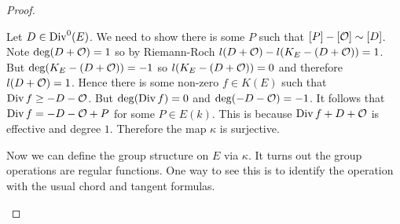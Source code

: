 \documentclass[11pt]{article}
\begin{document}
\begin{proof}
\begin{enumerate}
		Let $D\in \operatorname{Div}^0(E)$. We need to show there is some $P$ such that $[P] - [\mathcal{O}] \sim [D]$. Note $\deg(D+\mathcal{O}) = 1$ so by Riemann-Roch $l(D+\mathcal{O}) - l(K_E - (D + \mathcal{O})) = 1$. But $\deg (K_E - (D+\mathcal{O})) = -1$ so $l(K_E - (D+\mathcal{O})) = 0$ and therefore $l(D+\mathcal{O}) = 1$. Hence there is some non-zero $f\in K(E)$ such that $\operatorname{Div} f \geq -D - \mathcal{O}$. But $\deg(\operatorname{Div} f) = 0$ and $\deg (-D - \mathcal{O}) = -1$. It follows that $\operatorname{Div} f = -D - \mathcal{O} + P$ for some $P\in E(k)$. This is because $\operatorname{Div} f + D + \mathcal{O}$ is effective and degree $1$. Therefore the map $\kappa$ is surjective.
		
		Now we can define the group structure on $E$ via $\kappa$. It turns out the group operations are regular functions. One way to see this is to identify the operation with the usual chord and tangent formulas.
	\end{enumerate}
\end{proof}
\end{document}

